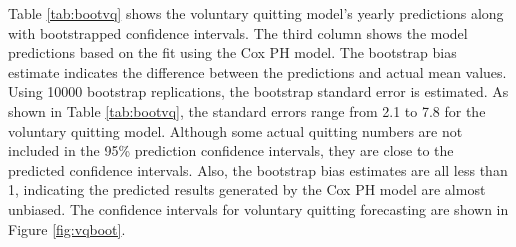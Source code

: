 Table \ref{tab:bootvq} shows the voluntary quitting model's yearly predictions along with bootstrapped confidence intervals. The third column shows the model predictions based on the fit using the Cox PH model.  The bootstrap bias estimate indicates the difference between the predictions and actual mean values. Using 10000 bootstrap replications, the bootstrap standard error is estimated. As shown in Table \ref{tab:bootvq}, the standard errors range from 2.1 to 7.8 for the voluntary quitting model. Although some actual quitting numbers are not included in the 95\% prediction confidence intervals, they are close to the predicted confidence intervals.  Also, the bootstrap bias estimates are all less than 1, indicating the predicted results generated by the Cox PH model are almost unbiased. The confidence intervals for voluntary quitting forecasting are shown in Figure \ref{fig:vqboot}.
